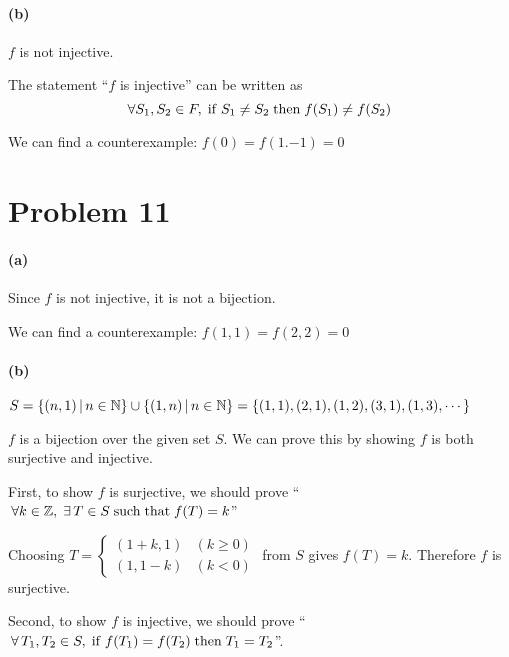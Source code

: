 \documentclass[10pt]{article}
\begin{document}
\paragraph{(b)} $f$ is not injective.

\vspace{0.3cm} The statement ``$f$ is injective'' can be written as
$$\forall S_1, S_2 \in F, \; {\rm if} \; S_1 \neq S_2 \; {\rm then} \; f(S_1) \neq f(S_2)$$

\vspace{0.3cm} We can find a counterexample: $f(\qty{0}) = f(\qty{1, -1}) = 0$

\section*{Problem 11}
\paragraph{(a)} Since $f$ is not injective, it is not a bijection.

\vspace{0.3cm} We can find a counterexample: $f(1, 1) = f(2, 2) = 0$


\paragraph{(b)}
$S = \qty{(n, 1) \,|\, n \in \mathbb{N}} \cup \qty{(1, n) \,|\, n \in \mathbb{N}} = \qty{(1,1), (2,1), (1,2), (3,1), (1,3), \cdots}$

\vspace{0.3cm} $f$ is a bijection over the given set $S$. We can prove this by showing $f$ is both surjective and injective.

\vspace{0.3cm} First, to show $f$ is surjective, we should prove ``$\,\forall k \in \mathbb{Z}, \; \exists \, T \in S {\rm \; such \; that \;} f(T) = k$''

\vspace{0.3cm} Choosing $T = \begin{cases} (1+k, 1)  & (k \geq 0) \\ (1, 1-k) & (k < 0) \end{cases}$ from $S$ gives $f(T) = k$. Therefore $f$ is surjective.

\vspace{0.3cm} Second, to show $f$ is injective, we should prove ``$\,\forall \,T_1, T_2 \in S, \; {\rm if} \; f(T_1) = f(T_2) \; {\rm then} \; T_1 = T_2$''.
\end{document}
